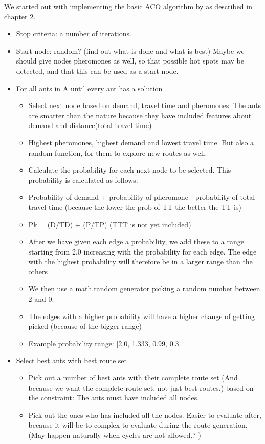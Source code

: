 We started out with implementing the basic ACO algorithm by \citet{nanda11} as described in chapter 2.
\begin{itemize}
\item Stop criteria: a number of iterations. 
\item Start node: random? (find out what is done and what is best) Maybe we should give nodes pheromones as well, so that possible hot spots may be detected, and that this can be used as a start node. 
\item For all ants in A until every ant has a solution
\begin{itemize}
\item Select next node based on demand, travel time and pheromones. The ants are smarter than the nature because they have included features about demand and distance(total travel time)
\item Highest pheromones, highest demand and lowest travel time. But also a random function, for them to explore new routes as well.
\item Calculate the probability for each next node to be selected. This probability is calculated as follows:
\item Probability of demand + probability of pheromone - probability of total travel time (because the lower the prob of TT the better the TT is)
\item Pk = (D/TD) + (P/TP) (TTT is not yet included)
\item After we have given each edge a probability, we add these to a range starting from 2.0 increasing with the probability for each edge. The edge with the highest probability will therefore be in a larger range than the others
\item We then use a math.random generator picking a random number between 2 and 0. 
\item The edges with a higher probability will have a higher change of getting picked (because of the bigger range)
\item Example probability range: [2.0, 1.333, 0.99, 0.3]. 
\end{itemize}
\item Select best ants with best route set
\begin{itemize}
\item Pick out a number of best ants with their complete route set (And because we want the complete route set, not just best routes.) based on the constraint: The ants must have included all nodes. 
\item Pick out the ones who has included all the nodes. Easier to evaluate after, because it will be to complex to evaluate during the route generation. (May happen naturally when cycles are not allowed.? )

\end{itemize}
\end{itemize}
